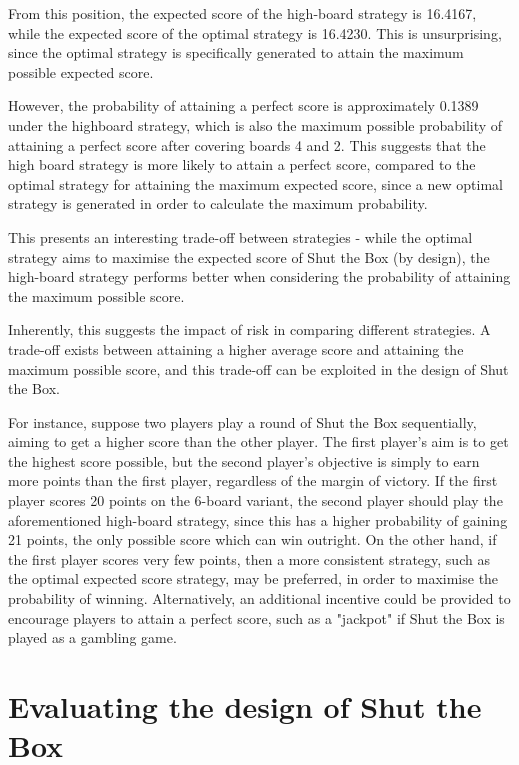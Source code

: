 \begin{example}
From this position, the expected score of the high-board strategy is 16.4167, while the expected score of the optimal strategy is 16.4230. This is unsurprising, since the optimal strategy is specifically generated to attain the maximum possible expected score.

However, the probability of attaining a perfect score is approximately 0.1389 under the highboard strategy, which is also the maximum possible probability of attaining a perfect score after covering boards 4 and 2. This suggests that the high board strategy is more likely to attain a perfect score, compared to the optimal strategy for attaining the maximum expected score, since a new optimal strategy is generated in order to calculate the maximum probability.

\end{example}

This presents an interesting trade-off between strategies - while the optimal strategy aims to maximise the expected score of Shut the Box (by design), the high-board strategy performs better when considering the probability of attaining the maximum possible score.

Inherently, this suggests the impact of risk in comparing different strategies. A trade-off exists between attaining a higher average score and attaining the maximum possible score, and this trade-off can be exploited in the design of Shut the Box.

For instance, suppose two players play a round of Shut the Box sequentially, aiming to get a higher score than the other player. The first player's aim is to get the highest score possible, but the second player's objective is simply to earn more points than the first player, regardless of the margin of victory. If the first player scores 20 points on the 6-board variant, the second player should play the aforementioned high-board strategy, since this has a higher probability of gaining 21 points, the only possible score which can win outright. On the other hand, if the first player scores very few points, then a more consistent strategy, such as the optimal expected score strategy, may be preferred, in order to maximise the probability of winning. Alternatively, an additional incentive could be provided to encourage players to attain a perfect score, such as a "jackpot" if Shut the Box is played as a gambling game.

\section{Evaluating the design of Shut the Box}



